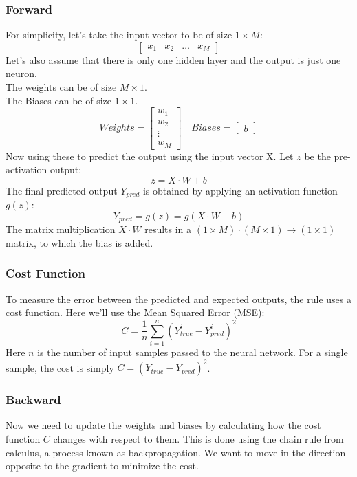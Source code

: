\documentclass[../main.tex]{subfiles}
\begin{document}
\subsubsection{Forward}
For simplicity, let's take the input vector to be of size $1 \times M$:
$$\begin{bmatrix}
  x_1 & x_2 & \hdots & x_M
\end{bmatrix}$$
Let's also assume that there is only one hidden layer and the output is just one neuron.\\
The weights can be of size $M \times 1$.\\
The Biases can be of size $1 \times 1$.
$$
Weights = \begin{bmatrix}
w_1 \\ w_2 \\ \vdots \\ w_M
\end{bmatrix}
\quad
Biases = \begin{bmatrix}
    b
\end{bmatrix}
$$
Now using these to predict the output using the input vector X.
Let $z$ be the pre-activation output:
$$z = X \cdot W + b$$
The final predicted output $Y_{pred}$ is obtained by applying an activation function $g(z)$:
$$
Y_{pred} = g(z) = g(X \cdot W + b)
$$
The matrix multiplication $X \cdot W$ results in a $(1 \times M) \cdot (M \times 1) \rightarrow (1 \times 1)$ matrix, to which the bias is added.

\subsubsection{Cost Function}
To measure the error between the predicted and expected outputs, the rule uses a cost function. Here we'll use the Mean Squared Error (MSE):
$$
C = \frac{1}{n}\sum_{i = 1}^{n}{(Y_{true}^i - Y_{pred}^i)^2}
$$
Here $n$ is the number of input samples passed to the neural network. For a single sample, the cost is simply $C = (Y_{true} - Y_{pred})^2$.

\subsubsection{Backward}
Now we need to update the weights and biases by calculating how the cost function $C$ changes with respect to them. This is done using the chain rule from calculus, a process known as backpropagation. We want to move in the direction opposite to the gradient to minimize the cost.
\end{document}
